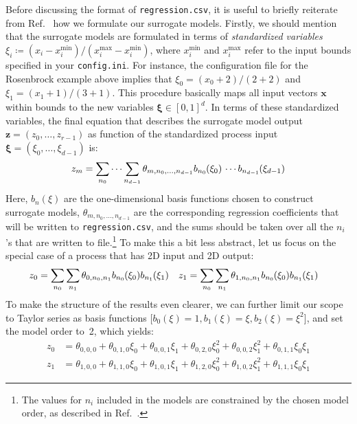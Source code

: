 \documentclass[a4paper,bibliography=numbered]{scrartcl}
\begin{document}
Before discussing the format of \texttt{regression.csv}, it is useful to briefly reiterate from Ref.~\cite{TechPaper} how we formulate our surrogate models.
Firstly, we should mention that the surrogate models are formulated in terms of \emph{standardized variables} $\xi_i \coloneq (x_i - x_i^\text{min})/(x_i^\text{max} - x_i^\text{min})$, where $x_i^\text{min}$ and $x_i^\text{max}$ refer to the input bounds specified in your \texttt{config.ini}.
For instance, the configuration file for the Rosenbrock example above implies that $\xi_0 = (x_0+2)/(2+2)$ and $\xi_1 = (x_1+1)/(3+1)$.
This procedure basically maps all input vectors $\bm{x}$ within bounds to the new variables $\bm{\xi} \in [0,1]^d$.
In terms of these standardized variables, the final equation that describes the surrogate model output~$\bm{z} = (z_0,\ldots,z_{r-1})$ as function of the standardized process input~$\bm{\xi} = (\xi_0,\ldots,\xi_{d-1})$ is:
\begin{equation}
	z_m = \sum_{n_0} \cdots \sum_{n_{d-1}} \theta_{m,n_0,\ldots,n_{d-1}}  b_{n_0}\kern-0.05em(\xi_0) \,\cdots b_{n_{d-1}}\kern-0.05em(\xi_{d-1})
\end{equation}
Here, $b_n(\xi)$ are the one-dimensional basis functions chosen to construct surrogate models, $\theta_{m,n_0,\ldots,n_{d-1}}$ are the corresponding regression coefficients that will be written to \texttt{regression.csv}, and the sums should be taken over all the $n_i$'s that are written to file.\footnote{The values for $n_i$ included in the models are constrained by the chosen model order, as described in Ref.~\cite{TechPaper}.}
To make this a bit less abstract, let us focus on the special case of a process that has 2D input and 2D output:
\begin{align}
	z_0 &= \sum_{n_0} \sum_{n_1} \theta_{0,n_0,n_1} b_{n_0}\kern-0.05em(\xi_0) b_{n_1}\kern-0.05em(\xi_1) &
	z_1 &= \sum_{n_0} \sum_{n_1} \theta_{1,n_0,n_1} b_{n_0}\kern-0.05em(\xi_0) b_{n_1}\kern-0.05em(\xi_1)
\end{align}
To make the structure of the results even clearer, we can further limit our scope to Taylor series as basis functions [$b_0(\xi) = 1, b_1(\xi) = \xi, b_2(\xi) = \xi^2$], and set the model order to~2, which yields:
\begin{equation}
	\begin{aligned}
		z_0 &= \theta_{0,0,0} + \theta_{0,1,0} \xi_0 + \theta_{0,0,1} \xi_1 + \theta_{0,2,0} \xi_0^2 + \theta_{0,0,2} \xi_1^2 + \theta_{0,1,1} \xi_0\xi_1 \\
		z_1 &= \theta_{1,0,0} + \theta_{1,1,0} \xi_0 + \theta_{1,0,1} \xi_1 + \theta_{1,2,0} \xi_0^2 + \theta_{1,0,2} \xi_1^2 + \theta_{1,1,1} \xi_0\xi_1
	\end{aligned}
\end{equation}
\end{document}
